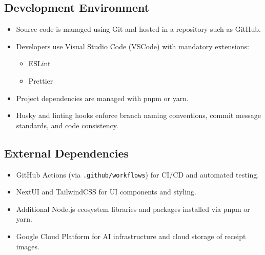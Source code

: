 \documentclass[12pt]{article}
\begin{document}
    \subsection{Development Environment}
    \begin{itemize}
        \item Source code is managed using Git and hosted in a repository such as GitHub.
        \item Developers use Visual Studio Code (VSCode) with mandatory extensions:
        \begin{itemize}
            \item ESLint
            \item Prettier
        \end{itemize}
        \item Project dependencies are managed with pnpm or yarn.
        \item Husky and linting hooks enforce branch naming conventions, commit message standards, and code consistency.
    \end{itemize}

    \subsection{External Dependencies}
    \begin{itemize}
        \item GitHub Actions (via \texttt{.github/workflows}) for CI/CD and automated testing.
        \item NextUI and TailwindCSS for UI components and styling.
        \item Additional Node.js ecosystem libraries and packages installed via pnpm or yarn.
        \item Google Cloud Platform for AI infrastructure and cloud storage of receipt images. 
    \end{itemize}


\end{document}
